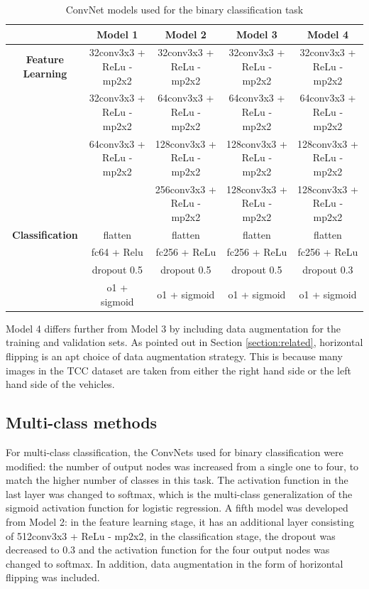 \documentclass[conference]{IEEEtran}
\begin{document}
\begin{table}[t]
	\caption[ConvNet models used for the binary classification task]{ConvNet models used for the binary classification task} \label{table:bin:method}
	\centering
\begin{tabular}{| c | c | c | c | c |}
\hline
 & \textbf{Model 1} & \textbf{Model 2}  &  \textbf{Model 3} & \textbf{Model 4}\\
\hline \hline
\textbf{Feature Learning} &  32conv3x3 + ReLu - mp2x2 & 32conv3x3  + ReLu - mp2x2 & 32conv3x3  + ReLu - mp2x2 & 32conv3x3  + ReLu - mp2x2 \\
 & 32conv3x3  + ReLu - mp2x2 & 64conv3x3  + ReLu - mp2x2 & 64conv3x3  + ReLu - mp2x2 & 64conv3x3  + ReLu - mp2x2\\
 & 64conv3x3  + ReLu - mp2x2 & 128conv3x3  + ReLu - mp2x2 & 128conv3x3  + ReLu - mp2x2 & 128conv3x3  + ReLu - mp2x2\\
 & & 256conv3x3  + ReLu - mp2x2 &  128conv3x3 + ReLu - mp2x2 & 128conv3x3 + ReLu - mp2x2 \\
 \hline
 \textbf{Classification} & flatten & flatten & flatten & flatten\\
  & fc64 + Relu & fc256 + ReLu & fc256 + ReLu & fc256 + ReLu \\
  & dropout 0.5 & dropout 0.5 & dropout 0.5 & dropout 0.3\\
  & o1 + sigmoid & o1 + sigmoid & o1 + sigmoid & o1 + sigmoid \\
 \hline
\end{tabular}
\end{table}

Model 4 differs further from Model 3 by including data augmentation for the training and validation sets. As pointed out in Section \ref{section:related}, horizontal flipping is an apt choice of data augmentation strategy. This is because many images in the TCC dataset are taken from either the right hand side or the left hand side of the vehicles.

\subsection{Multi-class methods}
For multi-class classification, the ConvNets used for binary classification were modified: the number of output nodes was increased from a single one to four, to match the higher number of classes in this task. The activation function in the last layer was changed to softmax, which is the multi-class generalization of the sigmoid activation function for logistic regression. A fifth model was developed from Model 2: in the feature learning stage, it has an additional layer consisting of 512conv3x3 + ReLu - mp2x2, in the classification stage, the dropout was decreased to 0.3 and the activation function for the four output nodes was changed to softmax. In addition, data augmentation in the form of horizontal flipping was included.
\end{document}
